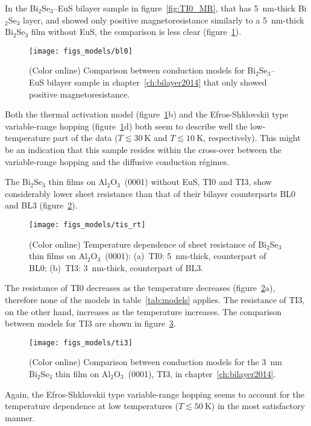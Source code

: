 In the Bi$_2$Se$_3$--EuS bilayer sample in figure~\ref{fig:TI0_MR}, that has \SI{5}{nm}-thick Bi$_2$Se$_3$ layer, and showed only positive magnetoresistance similarly to a \SI{5}{nm}-thick Bi$_2$Se$_3$ film without EuS, the comparison is less clear (figure~\ref{fig:models_bl0}). %
\begin{figure}[ht]%
    \centering%
    \texttt{[image: figs\_models/bl0]}%
    \caption[Conduction model comparison: Bi$_2$Se$_3$--EuS bilayer: BL0]{\label{fig:models_bl0}(Color online) Comparison between conduction models for Bi$_2$Se$_3$--EuS bilayer sample in chapter~\ref{ch:bilayer2014} that only showed positive magnetoresistance.}%
\end{figure}%
%
Both the thermal activation model (figure~\ref{fig:models_bl0}b) and the Efros-Shklovskii type variable-range hopping (figure~\ref{fig:models_bl0}d) both seem to describe well the low-temperature part of the data ($T \lesssim 30~\mathrm{K}$ and $T \lesssim 10~\mathrm{K}$, respectively). This might be an indication that this sample resides within the cross-over between the variable-range hopping and the diffusive conduction r\'egimes.

The Bi$_2$Se$_3$ thin films on Al$_2$O$_3$~(0001) without EuS, TI0 and TI3, show considerably lower sheet resistance than that of their bilayer counterparts BL0 and BL3 (figure~\ref{fig:models_tis_rt}). %
\begin{figure}[h!]%
    \centering%
    \texttt{[image: figs\_models/tis\_rt]}%
    \caption[Temperature dependence of sheet resistance of Bi$_2$Se$_3$ thin films: TI0~\&~TI3]{\label{fig:models_tis_rt}(Color online) Temperature dependence of sheet resistance of Bi$_2$Se$_3$ thin films on Al$_2$O$_3$~(0001): (a)~TI0: \SI{5}{nm}-thick, counterpart of BL0; (b)~TI3: \SI{3}{nm}-thick, counterpart of BL3.}%
\end{figure}%
%
The resistance of TI0 decreases as the temperature decreases (figure~\ref{fig:models_tis_rt}a), therefore none of the models in table~\ref{tab:models} applies. The resistance of TI3, on the other hand, increases as the temperature increases. The comparison between models for TI3 are shown in figure~\ref{fig:models_ti3}. %
\begin{figure}[h]%
    \centering%
    \texttt{[image: figs\_models/ti3]}%
    \caption[Conduction model comparison: Bi$_2$Se$_3$ thin films: TI3]{\label{fig:models_ti3}(Color online) Comparison between conduction models for the \SI{3}{nm} Bi$_2$Se$_3$ thin film on Al$_2$O$_3$~(0001), TI3, in chapter~\ref{ch:bilayer2014}.}%
\end{figure}%
%
Again, the Efros-Shklovskii type variable-range hopping seems to account for the temperature dependence at low temperatures ($T \lesssim 50~\mathrm{K}$) in the most satisfactory manner.

